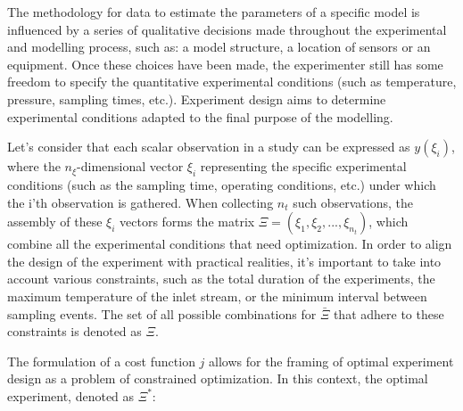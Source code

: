\documentclass[../Article_Design_of_Experiment.tex]{subfiles}
\begin{document}
	The methodology for data to estimate the parameters of a specific model is influenced by a series of qualitative decisions made throughout the experimental and modelling process, such as: a model structure, a location of sensors or an equipment. Once these choices have been made, the experimenter still has some freedom to specify the quantitative experimental conditions (such as temperature, pressure, sampling times, etc.). Experiment design aims to determine experimental conditions adapted to the final purpose of the modelling. 
	
	
	Let's consider that each scalar observation in a study can be expressed as $y(\xi_i)$, where the $n_\xi$-dimensional vector $\xi_i$ representing the specific experimental conditions (such as the sampling time, operating conditions, etc.) under which the i'th observation is gathered. When collecting $n_t$ such observations, the assembly of these $\xi_i$ vectors forms the matrix $\Xi = (\xi_1, \xi_2,..., \xi_{n_t})$, which combine all the experimental conditions that need optimization. In order to align the design of the experiment with practical realities, it's important to take into account various constraints, such as the total duration of the experiments, the maximum temperature of the inlet stream, or the minimum interval between sampling events. The set of all possible combinations for $\bar{\Xi}$ that adhere to these constraints is denoted as $\Xi$.
	
	
	The formulation of a cost function $j$ allows for the framing of optimal experiment design as a problem of constrained optimization. In this context, the optimal experiment, denoted as $\Xi^*$:
	
\end{document}
